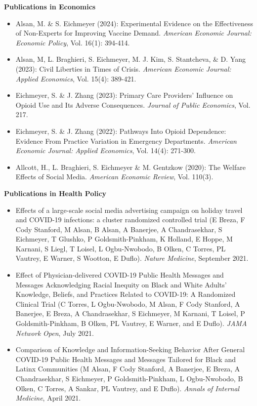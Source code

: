 \documentclass[letterpaper,11pt]{article}
\begin{document}
\begin{normalsize}
\textbf{Publications in Economics}
\setlength{\parindent}{0pt}
\setlength{\parskip}{0em}
\begin{itemize}[leftmargin=*]
\itemsep0em 
\item Alsan, M. \& S. Eichmeyer (2024): Experimental Evidence on the Effectiveness of Non-Experts for Improving Vaccine Demand. \textit{American Economic Journal: Economic Policy}, Vol. 16(1): 394-414.
\item Alsan, M, L. Braghieri, S. Eichmeyer, M. J. Kim, S. Stantcheva, \& D. Yang (2023): Civil Liberties in Times of Crisis. \textit{American Economic Journal: Applied Economics}, Vol. 15(4): 389-421.
\item Eichmeyer, S. \& J. Zhang (2023): Primary Care Providers’ Influence on Opioid Use and Its Adverse Consequences. \textit{Journal of Public Economics}, Vol. 217.
\item Eichmeyer, S. \& J. Zhang (2022): Pathways Into Opioid Dependence: Evidence From Practice Variation in Emergency Departments. \textit{American Economic Journal: Applied Economics}, Vol. 14(4): 271-300.
\item Allcott, H., L. Braghieri, S. Eichmeyer \& M. Gentzkow (2020): The Welfare Effects of Social Media. \textit{American Economic Review}, Vol. 110(3). 
\end{itemize}
\bigskip

\textbf{Publications in Health Policy} 
\begin{itemize}[leftmargin=*]
\itemsep0em 
\item Effects of a large-scale social media advertising campaign on holiday travel and COVID-19 infections: a cluster randomized controlled trial (E Breza, F Cody Stanford, M Alsan, B Alsan, A Banerjee, A Chandrasekhar, S Eichmeyer, T Glushko, P Goldsmith-Pinkham, K Holland, E Hoppe, M Karnani, S Liegl, T Loisel, L Ogbu-Nwobodo, B Olken, C Torres, PL Vautrey, E Warner, S Wootton, E Duflo).  \textit{Nature Medicine}, September 2021.
\item Effect of Physician-delivered COVID-19 Public Health Messages and Messages Acknowledging Racial Inequity on Black and White Adults' Knowledge, Beliefs, and Practices Related to COVID-19: A Randomized Clinical Trial (C Torres, L Ogbu-Nwobodo, M Alsan, F Cody Stanford, A Banerjee, E Breza, A Chandrasekhar, S Eichmeyer, M Karnani, T Loisel, P Goldsmith-Pinkham, B Olken, PL Vautrey, E Warner, and E Duflo).   \textit{JAMA Network Open}, July 2021. 
\item Comparison of Knowledge and Information-Seeking Behavior After General COVID-19 Public Health Messages and Messages Tailored for Black and Latinx Communities (M Alsan, F Cody Stanford, A Banerjee, E Breza, A Chandrasekhar, S Eichmeyer, P Goldsmith-Pinkham, L Ogbu-Nwobodo, B Olken, C Torres, A Sankar, PL Vautrey, and E Duflo).  \textit{Annals of Internal Medicine}, April 2021. 
\end{itemize}


\end{normalsize}
\end{document}
